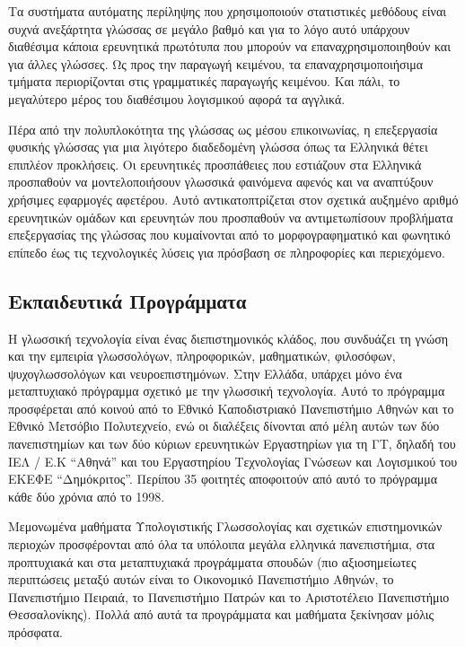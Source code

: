 \begin{multicols}{2}
Τα συστήματα αυτόματης περίληψης που χρησιμοποιούν στατιστικές μεθόδους είναι συχνά ανεξάρτητα γλώσσας σε μεγάλο βαθμό και για το λόγο αυτό υπάρχουν διαθέσιμα κάποια ερευνητικά πρωτότυπα που μπορούν να επαναχρησιμοποιηθούν και για άλλες γλώσσες. Ως προς την παραγωγή κειμένου, τα επαναχρησιμοποιήσιμα τμήματα περιορίζονται στις γραμματικές παραγωγής κειμένου. Και πάλι, το μεγαλύτερο μέρος του διαθέσιμου λογισμικού αφορά τα αγγλικά.

Πέρα από την πολυπλοκότητα της γλώσσας ως μέσου επικοινωνίας, η επεξεργασία φυσικής γλώσσας για μια λιγότερο διαδεδομένη γλώσσα όπως τα Ελληνικά θέτει επιπλέον προκλήσεις. Οι ερευνητικές προσπάθειες που εστιάζουν στα Ελληνικά προσπαθούν να μοντελοποιήσουν γλωσσικά φαινόμενα αφενός και να αναπτύξουν χρήσιμες εφαρμογές αφετέρου. Αυτό αντικατοπτρίζεται στον σχετικά αυξημένο αριθμό ερευνητικών ομάδων και ερευνητών που προσπαθούν να αντιμετωπίσουν προβλήματα επεξεργασίας της γλώσσας που κυμαίνονται από το μορφογραφηματικό και φωνητικό επίπεδο έως τις τεχνολογικές λύσεις για πρόσβαση σε πληροφορίες και περιεχόμενο.

\subsection{Εκπαιδευτικά Προγράμματα}

Η γλωσσική τεχνολογία είναι ένας διεπιστημονικός κλάδος, που συνδυάζει τη γνώση και την εμπειρία γλωσσολόγων, πληροφορικών, μαθηματικών, φιλοσόφων, ψυχογλωσσολόγων και νευροεπιστημόνων. Στην Ελλάδα, υπάρχει μόνο ένα μεταπτυχιακό πρόγραμμα σχετικό με την γλωσσική τεχνολογία. Αυτό το πρόγραμμα προσφέρεται από κοινού από το Εθνικό Καποδιστριακό Πανεπιστήμιο Αθηνών και το Εθνικό Μετσόβιο Πολυτεχνείο, ενώ οι διαλέξεις δίνονται από μέλη αυτών των δύο πανεπιστημίων και των δύο κύριων ερευνητικών Εργαστηρίων για τη ΓΤ, δηλαδή του ΙΕΛ / Ε.Κ “Αθηνά” και του Εργαστηρίου Τεχνολογίας Γνώσεων και Λογισμικού του ΕΚΕΦΕ “Δημόκριτος”. Περίπου 35 φοιτητές αποφοιτούν από αυτό το πρόγραμμα κάθε δύο χρόνια από το 1998.

Μεμονωμένα μαθήματα Υπολογιστικής Γλωσσολογίας και σχετικών επιστημονικών περιοχών προσφέρονται από όλα τα υπόλοιπα μεγάλα ελληνικά πανεπιστήμια, στα προπτυχιακά και στα μεταπτυχιακά προγράμματα σπουδών (πιο αξιοσημείωτες περιπτώσεις μεταξύ αυτών είναι το Οικονομικό Πανεπιστήμιο Αθηνών, το Πανεπιστήμιο Πειραιά, το Πανεπιστήμιο Πατρών και το Αριστοτέλειο Πανεπιστήμιο Θεσσαλονίκης). Πολλά από αυτά τα προγράμματα και μαθήματα ξεκίνησαν μόλις πρόσφατα.


\end{multicols}
